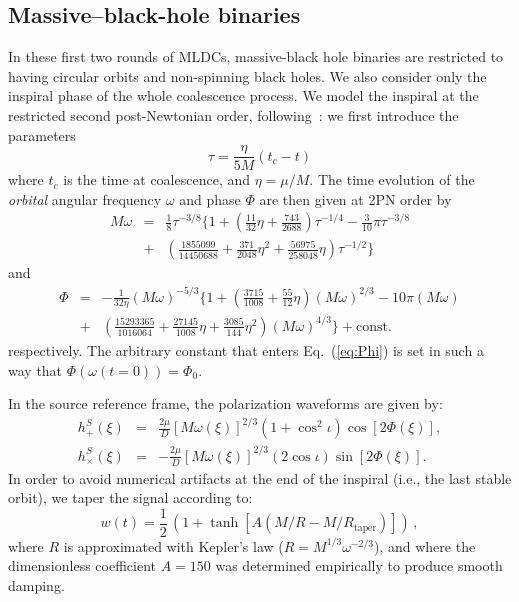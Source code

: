 \documentclass[12pt]{iopart}
\def\be{\begin{equation}}
\def\ee{\end{equation}}
\def\bea{\begin{eqnarray}}
\def\eea{\end{eqnarray}}
\begin{document}
\subsection{Massive--black-hole binaries}

In these first two rounds of MLDCs, massive-black hole binaries are restricted to having circular orbits and non-spinning black holes. We also consider only the inspiral phase of the whole coalescence process. We model the inspiral at the restricted second post-Newtonian order, following~\cite{Blanchet,DIS}: we first introduce the parameters
\be
\tau =  \frac{\eta}{5M}(t_c - t)
\ee
where $t_c$ is the time at coalescence, and $\eta = \mu/M$. The time evolution of the \emph{orbital} angular frequency $\omega$ and phase $\Phi$ are then given at 2PN order by
\bea
M\omega &=& \frac{1}{8} \tau^{-3/8}\Biggl\{ 1 + \left( \frac{11}{32}\eta + \frac{743}{2688}\right) 
\tau^{-1/4} - \frac{3}{10}\pi\tau^{-3/8} \nonumber \\
& + & \left(\frac{1855099}{14450688} + \frac{371}{2048}\eta^2 
+ \frac{56975}{258048}\eta\right)
\tau^{-1/2}  \Biggr\}
\label{fr}
\eea
and
\bea
\Phi &=& -\frac{1}{32\eta}(M\omega)^{-5/3}\Biggl\{ 1 + \left( \frac{3715}{1008} + \frac{55}{12}\eta\right)
(M\omega)^{2/3} - 10\pi(M\omega)  \nonumber \\
&+&  \left( \frac{15293365}{1016064} + \frac{27145}{1008}\eta + \frac{3085}{144}\eta^2\right)
(M\omega)^{4/3}\Biggr\} + \mathrm{const.}
\label{eq:Phi}
\eea
respectively. The arbitrary constant that enters Eq.\ (\ref{eq:Phi}) is set in such a way that $\Phi(\omega(t=0)) = \Phi_0$.

In the source reference frame, the polarization waveforms are given by:
%
\begin{eqnarray}
h^S_{+}(\xi) &=& \frac{2\mu}{D}[M\omega(\xi)]^{2/3}(1+\cos^2 \iota)\cos [2\Phi(\xi)], \\
h^S_{\times}(\xi) &=& -\frac{2\mu}{D}[M\omega(\xi)]^{2/3}(2 \cos \iota) \sin [2\Phi(\xi)]. \nonumber
\end{eqnarray}
%
In order to avoid numerical artifacts at the end of the inspiral (i.e., the last stable orbit), we taper the signal according to:
%
\begin{equation}
w(t) = \frac{1}{2}\,\left( 1 + \tanh\left[A (M/R - M/R_\mathrm{taper})\right] \right)\,,
\end{equation}
%
where $R$ is approximated with Kepler's law ($R = M^{1/3} \omega^{-2/3}$), and
where the dimensionless coefficient $A = 150$ was determined empirically to produce smooth damping.
\end{document}
